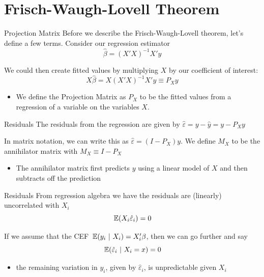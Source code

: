 \documentclass[aspectratio=169,t,11pt,table]{beamer}
\begin{document}
\section{Frisch-Waugh-Lovell Theorem}

\begin{frame}{Projection Matrix}
  Before we describe the Frisch-Waugh-Lovell theorem, let's define a few terms. Consider our regression estimator
  $$
    \hat{\beta} = \left( X'X \right)^{-1} X' y
  $$
  
  \bigskip
  We could then create fitted values by multiplying $X$ by our coefficient of interest: 
  $$
    X \hat{\beta} = X \left( X'X \right)^{-1} X' y \equiv P_X y
  $$
  \begin{itemize}
    \item We define the \alert{Projection Matrix} as $P_X$ to be the fitted values from a regression of a variable on the variables $X$.
  \end{itemize}
\end{frame}

\begin{frame}{Residuals}
  The residuals from the regression are given by $\hat{\varepsilon} = y - \hat{y} = y - P_X y$

  \bigskip
  In matrix notation, we can write this as $\hat{\varepsilon} = (I - P_X) y$. We define $M_X$ to be the \alert{annihilator matrix} with $M_X \equiv I - P_X$

  \pause
  \begin{itemize}
    \item The annihilator matrix first predicts $y$ using a linear model of $X$ and then subtracts off the prediction
  \end{itemize}
\end{frame}

\begin{frame}{Residuals}
  From regression algebra we have the residuals are (linearly) uncorrelated with $X_i$ 
  $$
    \expec{X_i \hat{\varepsilon}_i} = 0
  $$
  
  \bigskip
  \pause 
  If we assume that the CEF $\expec{y_i}{X_i} = X_i' \beta$, then we can go further and say 
  $$
    \expec{\hat{\varepsilon}_i}{X_i = x} = 0
  $$
  \begin{itemize}
    \item the remaining variation in $y_i$, given by $\hat{\varepsilon}_i$, is unpredictable given $X_i$
  \end{itemize}
\end{frame}
\end{document}
